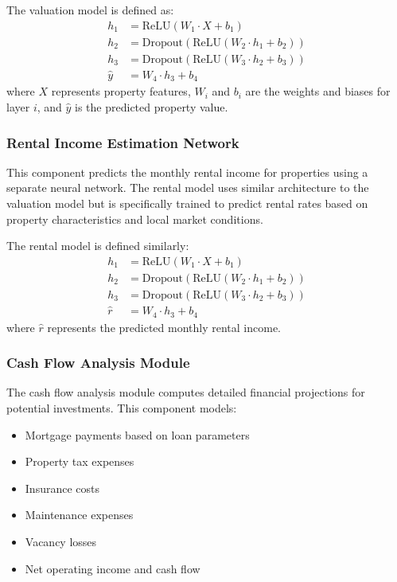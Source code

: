 \documentclass[conference]{IEEEtran}
\begin{document}
The valuation model is defined as:
\begin{align}
h_1 &= \text{ReLU}(W_1 \cdot X + b_1) \\
h_2 &= \text{Dropout}(\text{ReLU}(W_2 \cdot h_1 + b_2)) \\
h_3 &= \text{Dropout}(\text{ReLU}(W_3 \cdot h_2 + b_3)) \\
\hat{y} &= W_4 \cdot h_3 + b_4
\end{align}
where $X$ represents property features, $W_i$ and $b_i$ are the weights and biases for layer $i$, and $\hat{y}$ is the predicted property value.

\subsubsection{Rental Income Estimation Network}
This component predicts the monthly rental income for properties using a separate neural network. The rental model uses similar architecture to the valuation model but is specifically trained to predict rental rates based on property characteristics and local market conditions.

The rental model is defined similarly:
\begin{align}
h_1 &= \text{ReLU}(W_1 \cdot X + b_1) \\
h_2 &= \text{Dropout}(\text{ReLU}(W_2 \cdot h_1 + b_2)) \\
h_3 &= \text{Dropout}(\text{ReLU}(W_3 \cdot h_2 + b_3)) \\
\hat{r} &= W_4 \cdot h_3 + b_4
\end{align}
where $\hat{r}$ represents the predicted monthly rental income.

\subsubsection{Cash Flow Analysis Module}
The cash flow analysis module computes detailed financial projections for potential investments. This component models:

\begin{itemize}
\item Mortgage payments based on loan parameters
\item Property tax expenses
\item Insurance costs
\item Maintenance expenses
\item Vacancy losses
\item Net operating income and cash flow
\end{itemize}
\end{document}
